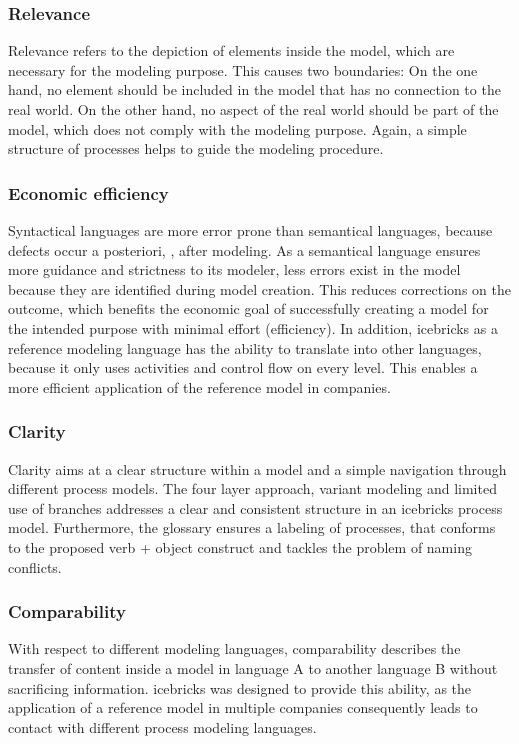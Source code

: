 	 \subsubsection{Relevance}
	 Relevance refers to the depiction of elements inside the model, which are necessary for the modeling purpose. This causes two boundaries: On the one hand, no element should be included in the model that has no connection to the real world. On the other hand, no aspect of the real world should be part of the model, which does not comply with the modeling purpose. Again, a simple structure of processes helps to guide the modeling procedure. 
	 
	  \subsubsection{Economic efficiency}
	 Syntactical languages are more error prone than semantical languages, because defects occur a posteriori, \ie, after modeling. As a semantical language ensures more guidance and strictness to its modeler, less errors exist in the model because they are identified during model creation. This reduces corrections on the outcome, which benefits the economic goal of successfully creating a model for the intended purpose with minimal effort (efficiency). In addition, icebricks as a reference modeling language has the ability to translate into other languages, because it only uses activities and control flow on every level. This enables a more efficient application of the reference model in companies. 
	 
	 \subsubsection{Clarity}
	 Clarity aims at a clear structure within a model and a simple navigation through different process models. The four layer approach, variant modeling and limited use of branches addresses a clear and consistent structure in an icebricks process model. Furthermore, the glossary ensures a labeling of processes, that conforms to the proposed verb + object construct \cite{7pmg} and tackles the problem of naming conflicts.
	 
	 \subsubsection{Comparability} 
	 With respect to different modeling languages, comparability describes the transfer of content inside a model in language A to another language B without sacrificing information. icebricks was designed to provide this ability, as the application of a reference model in multiple companies consequently leads to contact with different process modeling languages. 
	 
